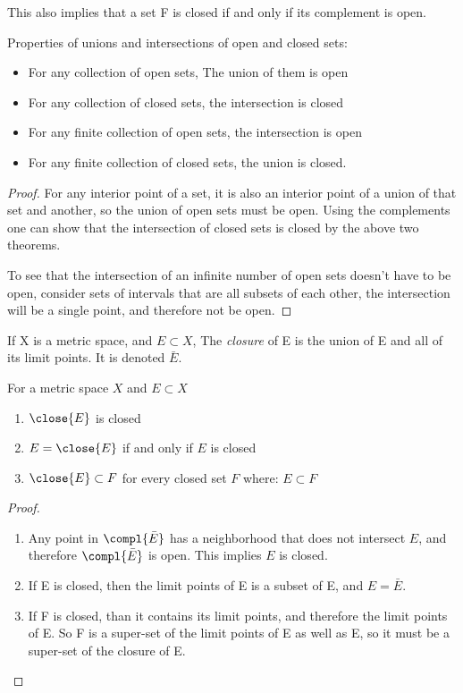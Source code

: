 \documentclass[12pt, letterpaper]{paper}
\begin{document}
This also implies that a set F is closed if and only if its complement
is open.

\begin{theorem}
  \label{thr:2.24}
  Properties of unions and intersections of open and closed sets:
  \begin{itemize}
  \item For any collection of open sets, The union of them is open
  \item For any collection of closed sets, the intersection is closed
  \item For any finite collection of open sets, the intersection is
    open
  \item For any finite collection of closed sets, the union is closed.
  \end{itemize}
\end{theorem}
\begin{proof}
  For any interior point of a set, it is also an interior point of a
  union of that set and another, so the union of open sets must be
  open. Using the complements one can show that the intersection of
  closed sets is closed by the above two theorems.

  To see that the intersection of an infinite number of open sets
  doesn't have to be open, consider sets of intervals that are all
  subsets of each other, the intersection will be a single point, and
  therefore not be open.
\end{proof}

If X is a metric space, and $E \subset X$, The \emph{closure} of E is
the union of E and all of its limit points. It is denoted $\bar{E}$.

\begin{theorem}
  \label{thr:2.27}
  For a metric space $X$ and $E \subset X$
  \begin{enumerate}
  \item $\close{E}$ is closed
  \item $E = \close{E}$ if and only if $E$ is closed
  \item $\close{E} \subset F$ for every closed set $F$ where:
    $E \subset F$
  \end{enumerate}
\end{theorem}
\begin{proof}
  \begin{enumerate}
  \item Any point in $\compl{ \bar{E} }$ has a neighborhood that does
    not intersect $E$, and therefore $\compl{ \bar{E} }$ is open. This
    implies $E$ is closed.
  \item If E is closed, then the limit points of E is a subset of E,
    and $E = \bar{E}$.
  \item If F is closed, than it contains its limit points, and
    therefore the limit points of E. So F is a super-set of the limit
    points of E as well as E, so it must be a super-set of the closure
    of E.
  \end{enumerate}
\end{proof}
\end{document}
